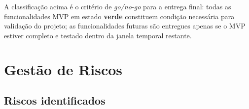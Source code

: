 \documentclass[11pt,a4paper,twoside]{article}
\begin{document}
\begin{note}
A classificação acima é o critério de \textit{go/no-go} para a entrega final: todas as funcionalidades MVP em estado \textbf{verde} constituem condição necessária para validação do projeto; as funcionalidades futuras são entregues apenas se o MVP estiver completo e testado dentro da janela temporal restante.
\end{note}

\section{Gestão de Riscos}

\subsection{Riscos identificados}
\end{document}
